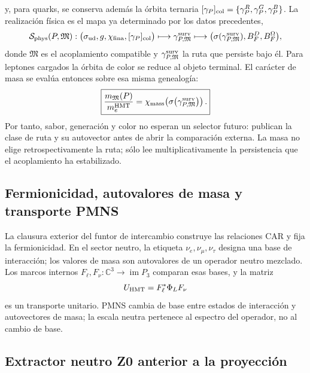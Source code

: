 y, para quarks, se conserva además la órbita ternaria
\([\gamma_P]_{\rm col}=\{\gamma_P^R,\gamma_P^G,\gamma_P^B\}\). La realización
física es el mapa ya determinado por los datos precedentes,
\begin{equation}
 \mathcal S_{\rm phys}(P,\mathfrak M):
 \bigl(\sigma_{\rm ud},g,\chi_{\rm fina},[\gamma_P]_{\rm col}\bigr)
 \longmapsto \gamma^{\rm surv}_{P,\mathfrak M}
 \longmapsto
 \bigl(\sigma(\gamma^{\rm surv}_{P,\mathfrak M}),
       B_F^D,B_F^\Omega\bigr),
 \label{eq:realizacion-fisica-sabor-ruta-cerrada-rev2}
\end{equation}
donde \(\mathfrak M\) es el acoplamiento compatible y
\(\gamma^{\rm surv}_{P,\mathfrak M}\) la ruta que persiste bajo él. Para
leptones cargados la órbita de color se reduce al objeto terminal. El carácter
de masa se evalúa entonces sobre esa misma genealogía:
\begin{equation}
 \boxed{
 \frac{m_{\mathfrak M}(P)}{m_e^{\rm HMT}}
 =\chi_{\rm mass}\!\left(
   \sigma\!\left(\gamma^{\rm surv}_{P,\mathfrak M}\right)\right).}
 \label{eq:masa-como-caracter-persistencia-rev2}
\end{equation}
Por tanto, sabor, generación y color no esperan un selector futuro: publican la
clase de ruta y su autovector antes de abrir la comparación externa. La masa no
elige retrospectivamente la ruta; sólo lee multiplicativamente la persistencia
que el acoplamiento ha estabilizado.

\subsection{Fermionicidad, autovalores de masa y transporte PMNS}

La clausura exterior del funtor de intercambio construye las relaciones CAR
y fija la fermionicidad. En el sector neutro, la etiqueta
\(\nu_e,\nu_\mu,\nu_\tau\) designa una base de interacción; los valores de
masa son autovalores de un operador neutro mezclado. Los marcos internos
\(F_\ell,F_\nu:\mathbb C^3\to\operatorname{im}P_3\) comparan esas bases, y
la matriz
\begin{equation}
 U_{\rm HMT}=F_\ell^*\Phi_LF_\nu
 \label{eq:transporte-pmns-generaciones-rev2}
\end{equation}
es un transporte unitario. PMNS cambia de base entre estados de interacción
y autovectores de masa; la escala neutra pertenece al espectro del operador,
no al cambio de base.

\subsection{Extractor neutro Z0 anterior a la proyección}
\label{sec:extractor-neutro-z0-torsion-rev2}

